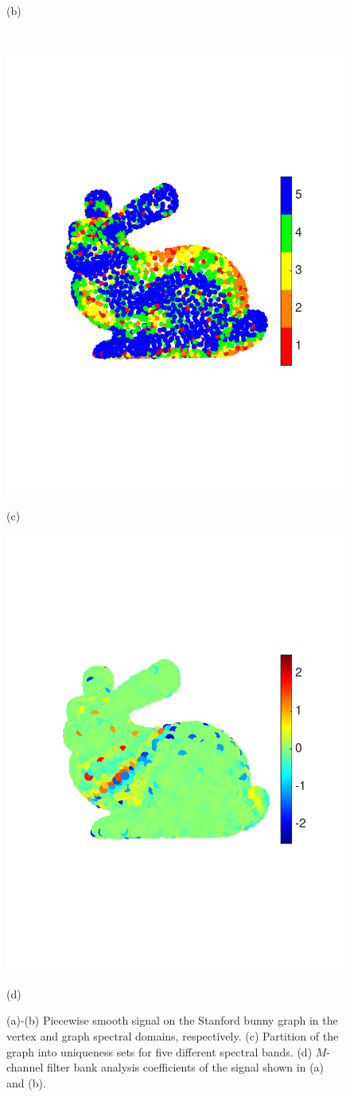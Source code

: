\documentclass[journal, 10pt]{IEEEtran}
\begin{document}
\begin{figure}[tbh]
\begin{minipage}[m]{0.48\linewidth}
\centerline{\small{(b)}}
\end{minipage} \\
\begin{minipage}[m]{0.48\linewidth}
\centerline{\includegraphics[width=.7\linewidth]{fig_bunny_partition}}
\centerline{\small{(c)}}
\end{minipage}
\begin{minipage}[m]{0.48\linewidth}
\centerline{\includegraphics[width=.7\linewidth]{fig_bunny_coef_all}}
\centerline{\small{(d)}}
\end{minipage}
\caption{(a)-(b) Piecewise smooth signal on the Stanford bunny graph \cite{bunny} in the vertex and graph spectral domains, respectively. (c) Partition of the graph into uniqueness sets for five different spectral bands. (d) $M$-channel filter bank analysis coefficients of the signal shown in (a) and (b). \vspace{-.1in}}\label{Fig:bunny_signal}
\end{figure}
\end{document}
